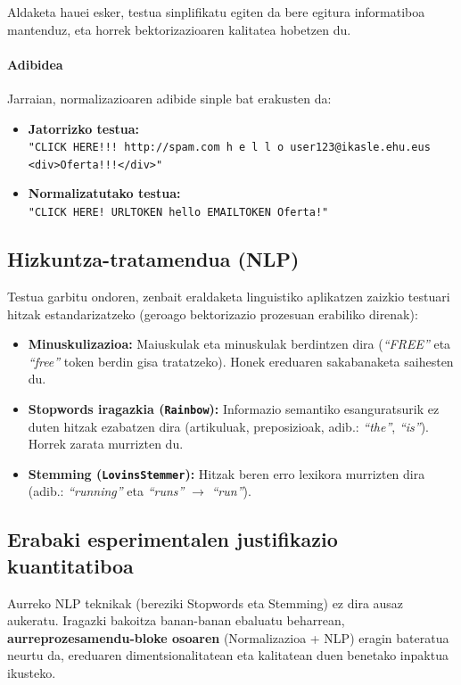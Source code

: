 \documentclass[12pt, a4paper]{article}
\begin{document}
Aldaketa hauei esker, testua sinplifikatu egiten da bere egitura informatiboa mantenduz, eta horrek bektorizazioaren kalitatea hobetzen du.

\paragraph{Adibidea}
Jarraian, normalizazioaren adibide sinple bat erakusten da:

\begin{itemize}
\item \textbf{Jatorrizko testua:} \\
\texttt{"CLICK HERE!!! http://spam.com h e l l o user123@ikasle.ehu.eus \\
<div>Oferta!!!</div>"}

\item \textbf{Normalizatutako testua:} \\
\texttt{"CLICK HERE! URLTOKEN hello EMAILTOKEN Oferta!"}
\end{itemize}

\subsection{Hizkuntza-tratamendua (NLP)}
Testua garbitu ondoren, zenbait eraldaketa linguistiko aplikatzen zaizkio testuari hitzak estandarizatzeko (geroago bektorizazio prozesuan erabiliko direnak):

\begin{itemize}
    \item \textbf{Minuskulizazioa:} Maiuskulak eta minuskulak berdintzen dira (\textit{``FREE''} eta \textit{``free''} token berdin gisa tratatzeko). Honek ereduaren sakabanaketa saihesten du.
    \item \textbf{Stopwords iragazkia (\texttt{Rainbow}):} Informazio semantiko esanguratsurik ez duten hitzak ezabatzen dira (artikuluak, preposizioak, adib.: \textit{``the''}, \textit{``is''}). Horrek zarata murrizten du.
    \item \textbf{Stemming (\texttt{LovinsStemmer}):} Hitzak beren erro lexikora murrizten dira (adib.: \textit{``running''} eta \textit{``runs''} $\rightarrow$ \textit{``run''}).
\end{itemize}

\subsection{Erabaki esperimentalen justifikazio kuantitatiboa}
Aurreko NLP teknikak (bereziki Stopwords eta Stemming) ez dira ausaz aukeratu. Iragazki bakoitza banan-banan ebaluatu beharrean, \textbf{aurreprozesamendu-bloke osoaren} (Normalizazioa + NLP) eragin bateratua neurtu da, ereduaren dimentsionalitatean eta kalitatean duen benetako inpaktua ikusteko.
\end{document}
